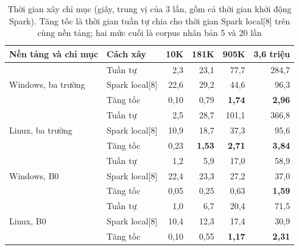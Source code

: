 \begin{table}[htbp]
\centering
\caption[Thời gian xây chỉ mục bằng engine Arrow]{Thời gian xây chỉ mục (giây, trung vị của 3 lần, gồm cả thời gian khởi động Spark). Tăng tốc là thời gian tuần tự chia cho thời gian Spark local[8] trên cùng nền tảng; hai mức cuối là corpus nhân bản 5 và 20 lần}\label{tab:build}
\begin{tabular}{@{}llrrrr@{}}
\toprule
Nền tảng và chỉ mục & Cách xây & 10K & 181K & 905K & 3,6 triệu \\
\midrule
\multirow{3}{*}{Windows, ba trường} & Tuần tự & 2,3 & 23,1 & 77,7 & 284,7 \\
 & Spark local[8] & 22,6 & 29,2 & 44,6 & 96,3 \\
 & Tăng tốc & 0,10 & 0,79 & \textbf{1,74} & \textbf{2,96} \\
\midrule
\multirow{3}{*}{Linux, ba trường} & Tuần tự & 2,5 & 28,7 & 101,1 & 366,8 \\
 & Spark local[8] & 10,9 & 18,7 & 37,3 & 95,6 \\
 & Tăng tốc & 0,23 & \textbf{1,53} & \textbf{2,71} & \textbf{3,84} \\
\midrule
\multirow{3}{*}{Windows, B0} & Tuần tự & 1,2 & 5,9 & 17,0 & 58,9 \\
 & Spark local[8] & 22,4 & 23,3 & 27,2 & 37,0 \\
 & Tăng tốc & 0,05 & 0,25 & 0,63 & \textbf{1,59} \\
\midrule
\multirow{3}{*}{Linux, B0} & Tuần tự & 1,0 & 6,7 & 20,4 & 71,5 \\
 & Spark local[8] & 10,4 & 12,3 & 17,4 & 30,9 \\
 & Tăng tốc & 0,10 & 0,55 & \textbf{1,17} & \textbf{2,31} \\
\bottomrule
\end{tabular}
\end{table}

